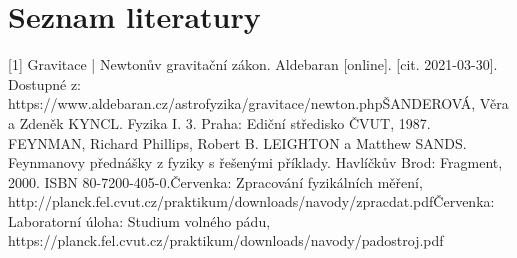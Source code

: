 \documentclass[titlepage]{article}
\begin{document}
	\section{Seznam literatury}
		[1] Gravitace | Newtonův gravitační zákon. Aldebaran [online]. [cit. 2021-03-30]. Dostupné z: https://www.aldebaran.cz/astrofyzika/gravitace/newton.php\newline
		[2] ŠANDEROVÁ, Věra a Zdeněk KYNCL. Fyzika I. 3. Praha: Ediční středisko ČVUT, 1987.\newline
		FEYNMAN, Richard Phillips, Robert B. LEIGHTON a Matthew SANDS. Feynmanovy přednášky z fyziky s řešenými příklady. Havlíčkův Brod: Fragment, 2000. ISBN 80-7200-405-0.\newline
		[3] Červenka: Zpracování fyzikálních měření,\newline
		http://planck.fel.cvut.cz/praktikum/downloads/navody/zpracdat.pdf\newline
 		[4] Červenka: Laboratorní úloha: Studium volného pádu,\newline
 		https://planck.fel.cvut.cz/praktikum/downloads/navody/padostroj.pdf
		
\end{document}
